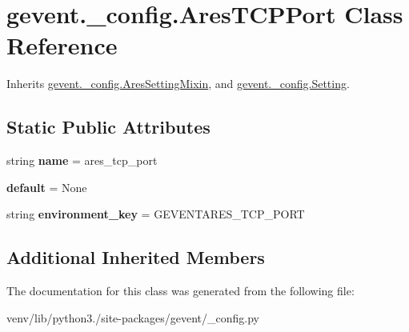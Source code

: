\hypertarget{classgevent_1_1__config_1_1_ares_t_c_p_port}{}\section{gevent.\+\_\+config.\+Ares\+T\+C\+P\+Port Class Reference}
\label{classgevent_1_1__config_1_1_ares_t_c_p_port}


Inherits \hyperlink{classgevent_1_1__config_1_1_ares_setting_mixin}{gevent.\+\_\+config.\+Ares\+Setting\+Mixin}, and \hyperlink{classgevent_1_1__config_1_1_setting}{gevent.\+\_\+config.\+Setting}.

\subsection*{Static Public Attributes}
\begin{DoxyCompactItemize}
\item 
\mbox{\label{classgevent_1_1__config_1_1_ares_t_c_p_port_a54e069dd1cd4803e7887281dc3655fa5}} 
string {\bfseries name} = \textquotesingle{}ares\+\_\+tcp\+\_\+port\textquotesingle{}
\item 
\mbox{\label{classgevent_1_1__config_1_1_ares_t_c_p_port_a8354023031780a1f2bb7fd6a4e44cf5a}} 
{\bfseries default} = None
\item 
\mbox{\label{classgevent_1_1__config_1_1_ares_t_c_p_port_a005d62ccbfc7ccd39211d8c4e9a6b27f}} 
string {\bfseries environment\+\_\+key} = \textquotesingle{}G\+E\+V\+E\+N\+T\+A\+R\+E\+S\+\_\+\+T\+C\+P\+\_\+\+P\+O\+RT\textquotesingle{}
\end{DoxyCompactItemize}
\subsection*{Additional Inherited Members}


The documentation for this class was generated from the following file\+:\begin{DoxyCompactItemize}
\item 
venv/lib/python3./site-\/packages/gevent/\+\_\+config.\+py\end{DoxyCompactItemize}
